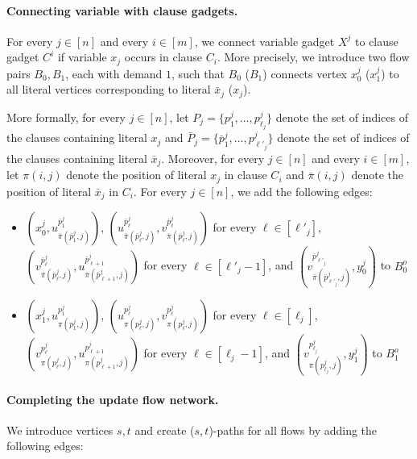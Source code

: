 \documentclass[fontsize=11pt,paper=a4]{book}
\begin{document}
\paragraph{Connecting variable with clause gadgets.}
For every \(j\in[n]\) and every \(i\in[m]\), we connect variable gadget \(X^j\) to clause gadget \(C^i\) if variable \(x_j\) occurs in clause \(C_i\).
More precisely, we introduce two flow pairs \(B_0,B_1\), each with demand \(1\), such that \(B_0\) (\(B_1\)) connects vertex \(x_0^j\) (\(x_1^j\)) to all literal vertices corresponding to literal \(\bar{x}_j\) (\(x_j\)).

More formally, for every \(j\in[n]\), let \(P_j=\{p_1^j,\dots,p_{\ell_j}^j\}\) denote the set of indices of the clauses containing literal \(x_j\) and \(\bar{P}_j=\{\bar{p}_1^j,\dots,p_{\ell'_j}^j\}\) denote the set of indices of the clauses containing literal \(\bar{x}_j\).
Moreover, for every \(j\in[n]\) and every \(i\in[m]\), let \(\pi(i,j)\) denote the position of literal \(x_j\) in clause \(C_i\) and \(\bar{\pi}(i,j)\) denote the position of literal \(\bar{x}_j\) in \(C_i\).
For every \(j\in[n]\), we add the following edges:

\begin{itemize}
\item \((x_0^j,u_{\bar{\pi}(\bar{p}_1^j,j)}^{\bar{p}_1^j})\), \((u_{\bar{\pi}(\bar{p}_{\ell}^j,j)}^{\bar{p}_{\ell}^j},v_{\bar{\pi}(\bar{p}_{\ell}^j,j)}^{\bar{p}_{\ell}^j})\) for every \(\ell\in[\ell'_j]\), \((v_{\bar{\pi}(\bar{p}_{\ell}^j,j)}^{\bar{p}_{\ell}^j},u_{\bar{\pi}(\bar{p}_{\ell+1}^j,j)}^{\bar{p}_{\ell+1}^j})\) for every \(\ell\in[\ell'_j-1]\), and \((v_{\bar{\pi}(\bar{p}_{\ell'_j}^j,j)}^{\bar{p}_{\ell'_j}^j},y_0^j)\) to \(B_0^o\)
\item \((x_1^j,u_{\pi(p_1^j,j)}^{p_1^j})\), \((u_{\pi(p_{\ell}^j,j)}^{p_{\ell}^j},v_{\pi(p_{\ell}^j,j)}^{p_{\ell}^j})\) for every \(\ell\in[\ell_j]\), \((v_{\pi(p_{\ell}^j,j)}^{p_{\ell}^j},u_{\pi(p_{\ell+1}^j,j)}^{p_{\ell+1}^j})\) for every \(\ell\in[\ell_j-1]\), and \((v_{\pi(p_{\ell_j}^j,j)}^{p_{\ell_j}^j},y_1^j)\) to \(B_1^o\)
\end{itemize}

\paragraph{Completing the update flow network.}
We introduce vertices \(s,t\) and create (\(s,t\))-paths for all flows by adding the following edges:
\end{document}
